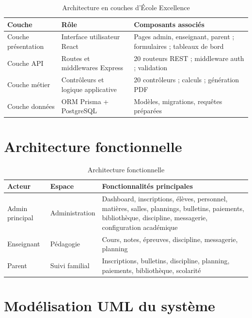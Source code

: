 \documentclass[12pt, a4paper]{report}
\begin{document}
\begin{table}[htbp]
\centering
\small
\begin{tabular}{|p{2.8cm}|p{5cm}|p{5cm}|}
\hline
\textbf{Couche} & \textbf{Rôle} & \textbf{Composants associés} \\
\hline
Couche présentation & Interface utilisateur React & Pages admin, enseignant, parent ; formulaires ; tableaux de bord \\
\hline
Couche API & Routes et middlewares Express & 20 routeurs REST ; middleware auth ; validation \\
\hline
Couche métier & Contrôleurs et logique applicative & 20 contrôleurs ; calculs ; génération PDF \\
\hline
Couche données & ORM Prisma + PostgreSQL & Modèles, migrations, requêtes préparées \\
\hline
\end{tabular}
\caption{Architecture en couches d'École Excellence}
\label{tab:archi_couches}
\end{table}

\section{Architecture fonctionnelle}

\begin{table}[htbp]
\centering
\small
\begin{tabular}{|p{2.5cm}|p{4cm}|p{7cm}|}
\hline
\textbf{Acteur} & \textbf{Espace} & \textbf{Fonctionnalités principales} \\
\hline
Admin principal & Administration & Dashboard, inscriptions, élèves, personnel, matières, salles, plannings, bulletins, paiements, bibliothèque, discipline, messagerie, configuration académique \\
\hline
Enseignant & Pédagogie & Cours, notes, épreuves, discipline, messagerie, planning \\
\hline
Parent & Suivi familial & Inscriptions, bulletins, discipline, planning, paiements, bibliothèque, scolarité \\
\hline
\end{tabular}
\caption{Architecture fonctionnelle}
\label{tab:archi_fonctionnelle}
\end{table}

\section{Modélisation UML du système}
\end{document}
